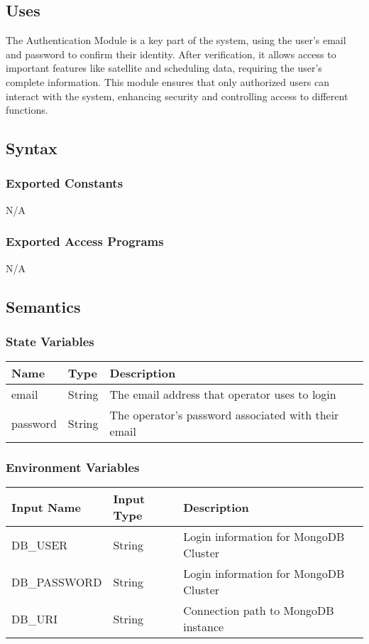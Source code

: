 \documentclass[12pt, titlepage]{article}
\begin{document}
\subsection{Uses}
The Authentication Module is a key part of the system, using the user's email and password to confirm their identity. After verification, it allows access to important features like satellite and scheduling data, requiring the user's complete information. This module ensures that only authorized users can interact with the system, enhancing security and controlling access to different functions.


\subsection{Syntax}

\subsubsection{Exported Constants}
N/A

\subsubsection{Exported Access Programs}

N/A

\subsection{Semantics}



\subsubsection{State Variables}
\begin{center}
\begin{tabular}{p{4cm} p{4cm} p{4cm}}
\hline
\textbf{Name} & \textbf{Type} & \textbf{Description} \\
\hline
email& String & The email address that operator uses to login\\
\hline
password& String & The operator’s password associated with their email\\
\end{tabular}
\end{center}


\subsubsection{Environment Variables}
\begin{center}
\begin{tabular}{p{4cm} p{4cm} p{4cm}}
\hline
\textbf{Input Name} & \textbf{Input Type} & \textbf{Description} \\
\hline
DB\_USER & String & Login information for MongoDB Cluster \\
\hline
DB\_PASSWORD & String & Login information for MongoDB Cluster \\
\hline
DB\_URI & String & Connection path to MongoDB instance \\
\hline
\end{tabular}
\end{center}
\end{document}
